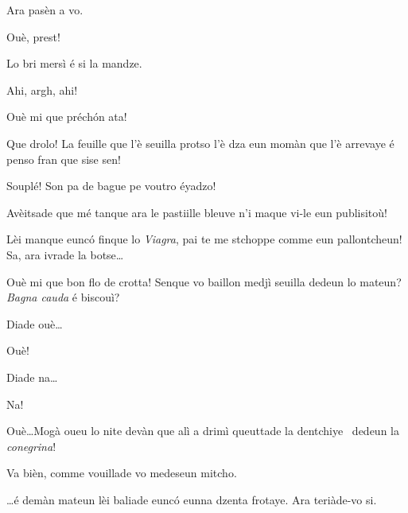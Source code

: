 \begin{drama}
\MedMitchospeaks{} Ara pasèn a vo. 

\Casimirspeaks Ouè, prest!


\MedMitchospeaks Lo bri mersì é si la mandze.


\Casimirspeaks{} Ahi, argh, ahi!

\MedMitchospeaks Ouè mi que préch\'on ata! 

\Casimirspeaks Que drolo! La feuille que l’è seuilla protso l’è dza eun momàn que l’è arrevaye é penso fran que sise sen!

\MedMitchospeaks Souplé! Son pa de bague pe voutro éyadzo!

\Casimirspeaks Avèitsade que mé tanque ara le pastiille bleuve n’i maque vi-le eun publisitoù!

\MedMitchospeaks Lèi manque eunc\'o finque lo \textit{Viagra}, pai te me stchoppe comme eun pallontcheun! Sa, ara ivrade la botse\ldots


\MedMitchospeaks Ouè mi que bon flo de crotta! Senque vo baillon medjì seuilla dedeun lo mateun? \textit{Bagna cauda} é biscouì? 


\MedMitchospeaks Diade ouè\ldots

\Casimirspeaks{} Ouè!

\MedMitchospeaks Diade na\ldots

\Casimirspeaks{} Na!

\MedMitchospeaks Ouè\ldots Mogà oueu lo nite devàn que alì a drimì queuttade la dentchiye \dentiera\ dedeun la \textit{conegrina}!

\Casimirspeaks Va bièn, comme vouillade vo medeseun mitcho.

\MedMitchospeaks \ldots é demàn mateun lèi baliade eunc\'o eunna dzenta frotaye. Ara teriàde-vo si.



\end{drama}
